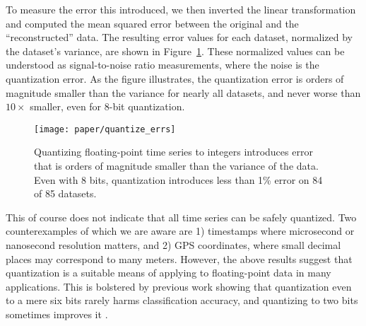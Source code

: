 To measure the error this introduced, we then inverted the linear transformation and computed the mean squared error between the original and the ``reconstructed'' data. The resulting error values for each dataset, normalized by the dataset's variance, are shown in Figure~\ref{fig:quantize_errs}. These normalized values can be understood as signal-to-noise ratio measurements, where the noise is the quantization error. As the figure illustrates, the quantization error is orders of magnitude smaller than the variance for nearly all datasets, and never worse than $10\times$ smaller, even for 8-bit quantization.

\begin{figure}[h]
\begin{center}
    \texttt{[image: paper/quantize\_errs]}
    \caption{Quantizing floating-point time series to integers introduces error that is orders of magnitude smaller than the variance of the data. Even with 8 bits, quantization introduces less than 1\% error on 84 of 85 datasets.}
    \label{fig:quantize_errs}
    \vspace*{-3mm}
\end{center}
\end{figure}

This of course does not indicate that all time series can be safely quantized. Two counterexamples of which we are aware are 1) timestamps where microsecond or nanosecond resolution matters, and 2) GPS coordinates, where small decimal places may correspond to many meters. However, the above results suggest that quantization is a suitable means of applying \minesp to floating-point data in many applications. This is bolstered by previous work showing that quantization even to a mere six bits \cite{epenthesis} rarely harms classification accuracy, and quantizing to two bits sometimes improves it \cite{saxvsm}.



